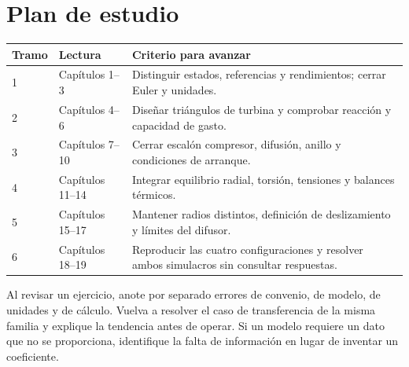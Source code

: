 \documentclass[10pt,openany]{book}
\begin{document}
\chapter{Plan de estudio}
\begin{longtable}{p{.15\linewidth}p{.32\linewidth}p{.40\linewidth}}
\textbf{Tramo} & \textbf{Lectura} & \textbf{Criterio para avanzar}\\\hline
1 & Capítulos 1--3 & Distinguir estados, referencias y rendimientos; cerrar Euler y unidades.\\
2 & Capítulos 4--6 & Diseñar triángulos de turbina y comprobar reacción y capacidad de gasto.\\
3 & Capítulos 7--10 & Cerrar escalón compresor, difusión, anillo y condiciones de arranque.\\
4 & Capítulos 11--14 & Integrar equilibrio radial, torsión, tensiones y balances térmicos.\\
5 & Capítulos 15--17 & Mantener radios distintos, definición de deslizamiento y límites del difusor.\\
6 & Capítulos 18--19 & Reproducir las cuatro configuraciones y resolver ambos simulacros sin consultar respuestas.\\
\end{longtable}
Al revisar un ejercicio, anote por separado errores de convenio, de modelo, de unidades y de cálculo. Vuelva a resolver el caso de transferencia de la misma familia y explique la tendencia antes de operar. Si un modelo requiere un dato que no se proporciona, identifique la falta de información en lugar de inventar un coeficiente.
\backmatter
\end{document}
